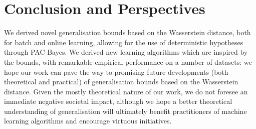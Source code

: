 \section{Conclusion and Perspectives}

We derived novel generalisation bounds based on the Wasserstein distance, both for batch and online learning, allowing for the use of deterministic hypotheses through PAC-Bayes.
We derived new learning algorithms which are inspired by the bounds, with remarkable empirical performance on a number of datasets: we hope our work can pave the way to promising future developments (both theoretical and practical) of generalisation bounds based on the Wasserstein distance.
Given the mostly theoretical nature of our work, we do not foresee an immediate negative societal impact, although we hope a better theoretical understanding of generalisation will ultimately benefit practitioners of machine learning algorithms and encourage virtuous initiatives.